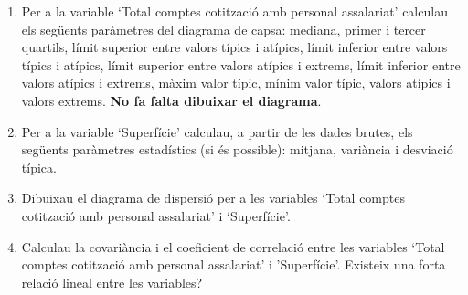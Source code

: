 \documentclass[a4paper,12pt]{report}
\begin{document}
\begin{enumerate}
\item Per a la variable `Total comptes cotització amb personal assalariat' calculau els següents paràmetres del diagrama de capsa:
mediana, primer i tercer quartils, límit superior entre valors típics i atípics,
límit inferior entre valors típics i atípics, límit superior entre valors atípics i extrems,
límit inferior entre valors atípics i extrems, màxim valor típic, mínim valor típic, valors
atípics i valors extrems. \textbf{No fa falta dibuixar el diagrama}.

\item Per a la variable `Superfície' calculau, a partir de les dades brutes, els 
següents paràmetres estadístics (si és possible): mitjana, variància i
desviació típica.

\item Dibuixau el diagrama de dispersió per a les variables `Total comptes cotització amb personal assalariat' i `Superfície'.

\item Calculau la covariància i el coeficient de correlació entre les variables 
`Total comptes cotització amb personal assalariat' i 'Superfície'. Existeix una forta relació lineal entre les variables?



\end{enumerate}
\end{document}
